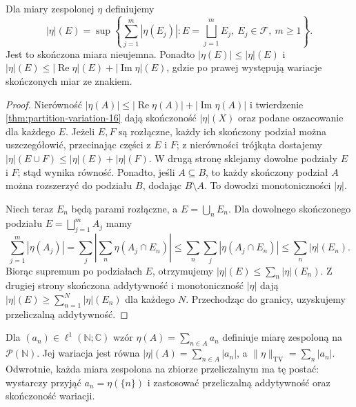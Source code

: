 \begin{twierdzenie}
\label{thm:complex-variation-16}
Dla miary zespolonej $\eta$ definiujemy
\[
|\eta|(E)=\sup\left\{\sum_{j=1}^m|\eta(E_j)|:
E=\bigsqcup_{j=1}^mE_j,\ E_j\in\mathcal F,\ m\ge1\right\}.
\]
Jest to skończona miara nieujemna. Ponadto
$|\eta(E)|\le|\eta|(E)$ i
$|\eta|(E)\le|\operatorname{Re}\eta|(E)+
|\operatorname{Im}\eta|(E)$, gdzie po prawej występują
wariacje skończonych miar ze znakiem.
\end{twierdzenie}
\begin{proof}
Nierówność $|\eta(A)|\le|\operatorname{Re}\eta(A)|+
|\operatorname{Im}\eta(A)|$ i twierdzenie
\ref{thm:partition-variation-16} dają skończoność
$|\eta|(X)$ oraz podane oszacowanie dla każdego $E$.
Jeżeli $E,F$ są rozłączne, każdy ich skończony podział
można uszczegółowić, przecinając części z $E$ i $F$;
z nierówności trójkąta dostajemy
$|\eta|(E\cup F)\le|\eta|(E)+|\eta|(F)$.
W drugą stronę sklejamy dowolne podziały $E$ i $F$;
stąd wynika równość. Ponadto, jeśli $A\subseteq B$,
to każdy skończony podział $A$ można rozszerzyć do
podziału $B$, dodając $B\setminus A$. To dowodzi
monotoniczności $|\eta|$.

Niech teraz $E_n$ będą parami rozłączne, a
$E=\bigcup_nE_n$. Dla dowolnego skończonego
podziału $E=\bigsqcup_{j=1}^m A_j$ mamy
\[
\sum_{j=1}^m|\eta(A_j)|
=\sum_j\left|\sum_n\eta(A_j\cap E_n)\right|
\le\sum_n\sum_j|\eta(A_j\cap E_n)|
\le\sum_n|\eta|(E_n).
\]
Biorąc supremum po podziałach $E$, otrzymujemy
$|\eta|(E)\le\sum_n|\eta|(E_n)$. Z drugiej strony
skończona addytywność i monotoniczność $|\eta|$
dają $|\eta|(E)\ge\sum_{n=1}^N|\eta|(E_n)$
dla każdego $N$. Przechodząc do granicy, uzyskujemy
przeliczalną addytywność.
\end{proof}

\begin{przyklad}
Dla $(a_n)\in\ell^1(\mathbb N;\mathbb C)$ wzór
$\eta(A)=\sum_{n\in A}a_n$ definiuje miarę zespoloną
na $\mathcal P(\mathbb N)$. Jej wariacja jest równa
$|\eta|(A)=\sum_{n\in A}|a_n|$, a
$\|\eta\|_{\mathrm{TV}}=\sum_n|a_n|$.
Odwrotnie, każda miara zespolona na zbiorze
przeliczalnym ma tę postać: wystarczy przyjąć
$a_n=\eta(\{n\})$ i zastosować przeliczalną
addytywność oraz skończoność wariacji.
\end{przyklad}

